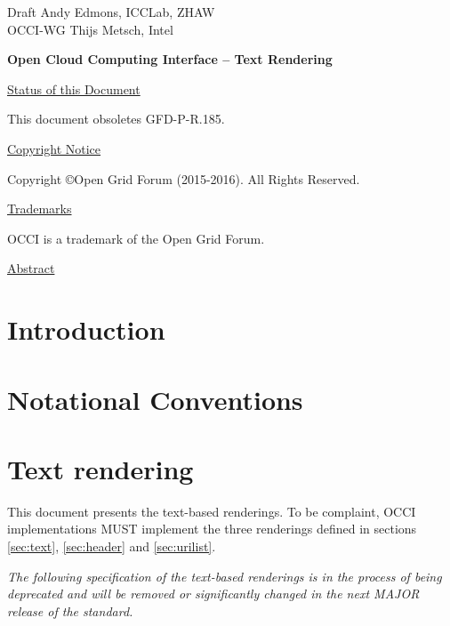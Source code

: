 \documentclass[10pt,a4paper]{article}
\begin{document}
\thispagestyle{empty}

Draft \hfill Andy Edmons, ICCLab, ZHAW \\
OCCI-WG \hfill Thijs Metsch, Intel\\
\rightline {\today}

\vspace*{0.5in}

\begin{Large}
\textbf{Open Cloud Computing Interface -- Text Rendering}
\end{Large}

\vspace*{0.5in}

\underline{Status of this Document}



This document obsoletes GFD-P-R.185.

\underline{Copyright Notice}

Copyright \copyright Open Grid Forum (2015-2016). All Rights Reserved.

\underline{Trademarks}

OCCI is a trademark of the Open Grid Forum.

\underline{Abstract}



\newpage
\tableofcontents
\newpage

\section{Introduction}


\section{Notational Conventions}


\section{Text rendering}

This document presents the text-based renderings. To be complaint, OCCI implementations
MUST implement the three renderings defined in sections \ref{sec:text}, \ref{sec:header} and \ref{sec:urilist}.

\emph{The following specification of the text-based renderings is in the process of being
deprecated and will be removed or significantly changed in the next MAJOR release of the standard.}
\end{document}
